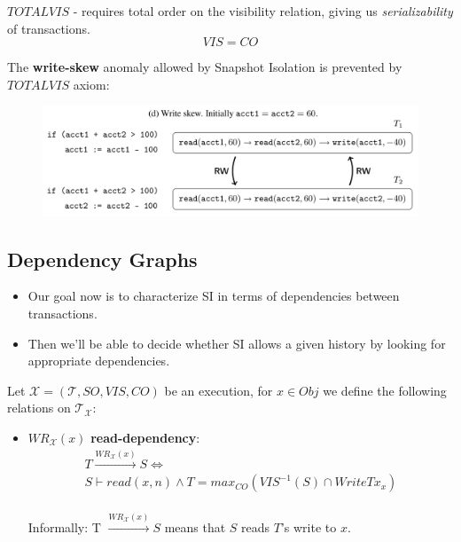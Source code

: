 \documentclass{beamer}
\begin{document}
\begin{frame}
	$TOTALVIS$ - requires total order on the visibility relation, giving us \emph{serializability} of transactions.
	$$ VIS = CO $$
\end{frame}

\begin{frame}
	The \textbf{write-skew} anomaly allowed by Snapshot Isolation is prevented by $TOTALVIS$ axiom:
	\begin{figure}
		\includegraphics[scale=0.25]{fig2d}
	\end{figure}
\end{frame}

\subsection{Dependency Graphs}

\begin{frame}
	\begin{itemize}
		\item Our goal now is to characterize SI in terms of dependencies between transactions.
		\item Then we'll be able to decide whether SI allows a given history by looking for appropriate dependencies.
	\end{itemize}
\end{frame}

\begin{frame}
	Let $\mathcal{X} = (\mathcal{T}, SO, VIS, CO)$ be an execution, for $x \in Obj$ we define the following relations on $\mathcal{T}_\mathcal{X}$:
	\begin{itemize}
		\item $WR_\mathcal{X}(x)$ \textbf{read-dependency}:
		\begin{multline*}
			T \xrightarrow{WR_\mathcal{X}(x)} S \Leftrightarrow \\
			S \vdash read(x,n) \wedge T = max_{CO}\left( VIS^{-1}(S) \cap WriteTx_x \right)
		\end{multline*} \\
		Informally: T $ \xrightarrow{WR_\mathcal{X}(x)} S $ means that $S$ reads $T$'s write to $x$.
	\end{itemize}
\end{frame}
\end{document}
